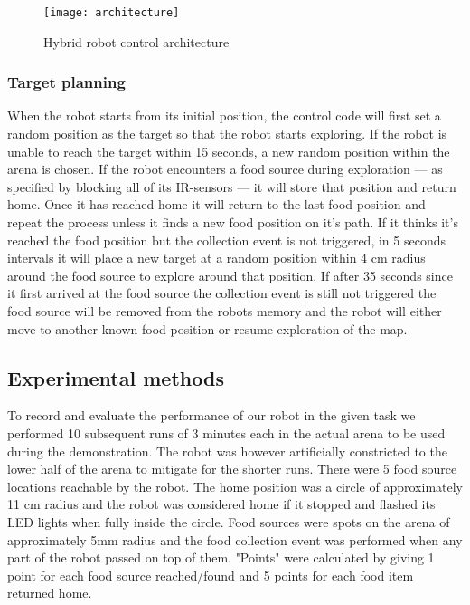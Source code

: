 \documentclass[paper=a4, fontsize=12pt]{scrartcl}	%
\numberwithin{equation}{section}		%
\numberwithin{figure}{section}			%
\numberwithin{table}{section}				%
\begin{document}
\begin{figure}[!ht]
 \centering
  \texttt{[image: architecture]}
  \caption{Hybrid robot control architecture}
\label{architecture}
\end{figure}


\subsubsection{Target planning}
When the robot starts from its initial position, the control code will first set a random position as the target so that the robot starts exploring. If the robot is unable to reach the target within 15 seconds, a new random position within the arena is chosen. If the robot encounters a food source during exploration --- as specified by blocking all of its IR-sensors --- it will store that position and return home. Once it has reached home it will return to the last food position and repeat the process unless it finds a new food position on it's path. If it thinks it's reached the food position but the collection event is not triggered, in 5 seconds intervals it will place a new target at a random position within 4 cm radius around the food source to explore around that position. If after 35 seconds since it first arrived at the food source the collection event is still not triggered the food source will be removed from the robots memory and the robot will either move to another known food position or resume exploration of the map.

\subsection{Experimental methods}
To record and evaluate the performance of our robot in the given task we performed 10 subsequent runs of 3 minutes each in the actual arena to be used during the demonstration. The robot was however artificially constricted to the lower half of the arena to mitigate for the shorter runs. There were 5 food source locations reachable by the robot. The home position was a circle of approximately 11 cm radius and the robot was considered home if it stopped and flashed its LED lights when fully inside the circle. Food sources were spots on the arena of approximately 5mm radius and the food collection event was performed when any part of the robot passed on top of them. "Points" were calculated by giving 1 point for each food source reached/found and 5 points for each food item returned home.
\end{document}
